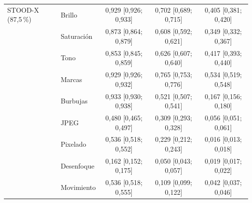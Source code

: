 {\begin{longtable}{llccc}
\midrule
STOOD-X (87,5\,\%) & Brillo & 0{,}929 [0{,}926; 0{,}933] & 0{,}702 [0{,}689; 0{,}715] & 0{,}405 [0{,}381; 0{,}420] \\
 & Saturación & 0{,}873 [0{,}864; 0{,}879] & 0{,}608 [0{,}592; 0{,}621] & 0{,}349 [0{,}332; 0{,}367] \\
 & Tono & 0{,}853 [0{,}845; 0{,}859] & 0{,}626 [0{,}607; 0{,}640] & 0{,}417 [0{,}393; 0{,}440] \\
 & Marcas & 0{,}929 [0{,}926; 0{,}932] & 0{,}765 [0{,}753; 0{,}776] & 0{,}534 [0{,}519; 0{,}548] \\
 & Burbujas & 0{,}933 [0{,}930; 0{,}938] & 0{,}521 [0{,}507; 0{,}541] & 0{,}167 [0{,}156; 0{,}180] \\
 & JPEG & 0{,}480 [0{,}465; 0{,}497] & 0{,}309 [0{,}293; 0{,}328] & 0{,}056 [0{,}051; 0{,}061] \\
 & Pixelado & 0{,}536 [0{,}518; 0{,}552] & 0{,}229 [0{,}212; 0{,}243] & 0{,}016 [0{,}013; 0{,}018] \\
 & Desenfoque & 0{,}162 [0{,}152; 0{,}175] & 0{,}050 [0{,}043; 0{,}057] & 0{,}019 [0{,}017; 0{,}022] \\
 & Movimiento & 0{,}536 [0{,}518; 0{,}555] & 0{,}109 [0{,}099; 0{,}122] & 0{,}042 [0{,}037; 0{,}046] \\
\end{longtable}
}
